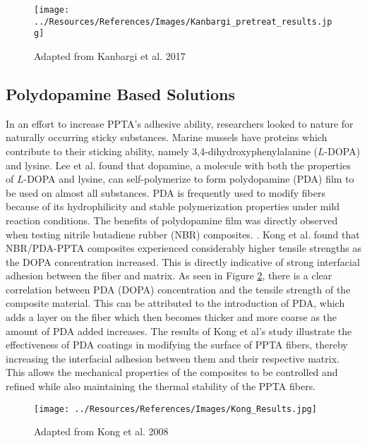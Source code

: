 \documentclass[12pt]{article}
\begin{document}
\begin{multicols}{2}
\vspace{5em}

\begin{figure}[H]
    \centering
    \texttt{[image: ../Resources/References/Images/Kanbargi\_pretreat\_results.jpg]}
    \caption{\scriptsize{Adapted from Kanbargi et al. 2017 \citep{Kanbargi2017}}}
    \label{fig:Kanbargi_Results}
\end{figure}

\subsection{Polydopamine Based Solutions}

\indent In an effort to increase PPTA's adhesive ability, researchers looked to nature for naturally occurring sticky substances. Marine mussels have proteins which contribute to their sticking ability, namely 3,4-dihydroxyphenylalanine ($L$-DOPA) and lysine. \citep{Waite2001} Lee et al. \citep{Lee2007} found that dopamine, a molecule with both the properties of $L$-DOPA and lysine, can self-polymerize to form polydopamine (PDA) film to be used on almost all substances. \citep{Yuan2017} PDA is frequently used to modify fibers because of its hydrophilicity and stable polymerization properties under mild reaction conditions. The benefits of polydopamine film was directly observed when testing nitrile butadiene rubber (NBR) composites. \citep{Kong2018}. Kong et al. \citep{Kong2018} found that NBR/PDA-PPTA composites experienced considerably higher tensile strengths as the DOPA concentration increased. This is directly indicative of strong interfacial adhesion between the fiber and matrix. As seen in Figure \ref{fig:Kong_Results}, there is a clear correlation between PDA (DOPA) concentration and the tensile strength of the composite material. This can be attributed to the introduction of PDA, which adds a layer on the fiber which then becomes thicker and more coarse as the amount of PDA added increases. The results of Kong et al's \citep{Kong2018} study illustrate the effectiveness of PDA coatings in modifying the surface of PPTA fibers, thereby increasing the interfacial adhesion between them and their respective matrix. This allows the mechanical properties of the composites to be controlled and refined while also maintaining the thermal stability of the PPTA fibers. 

\begin{figure}[H]
    \centering
    \texttt{[image: ../Resources/References/Images/Kong\_Results.jpg]}
    \caption{\scriptsize{Adapted from Kong et al. 2008 \citep{Kong2018}}}
    \label{fig:Kong_Results}
\end{figure}


\end{multicols}
\end{document}
